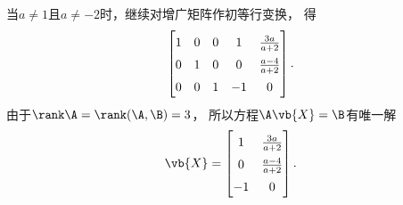 \begin{example}
\begin{solution}
当\(a\neq1\)且\(a\neq-2\)时，继续对增广矩阵作初等行变换，
得\begin{equation*}
	\def\arraystretch{1.5}
	\begin{bmatrix}
		1 & 0 & 0 & 1 & \frac{3a}{a+2} \\
		0 & 1 & 0 & 0 & \frac{a-4}{a+2} \\
		0 & 0 & 1 & -1 & 0
	\end{bmatrix}.
\end{equation*}
由于\(\rank\A = \rank(\A,\B) = 3\)，
所以方程\(\A\vb{X}=\B\)有唯一解\begin{equation*}
	\def\arraystretch{1.5}
	\vb{X} = \begin{bmatrix}
		1 & \frac{3a}{a+2} \\
		0 & \frac{a-4}{a+2} \\
		-1 & 0
	\end{bmatrix}.
\end{equation*}
\end{solution}
\end{example}
